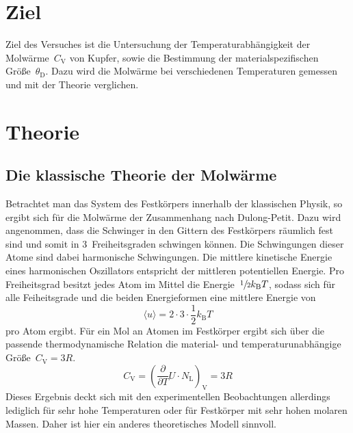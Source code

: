 \section{Ziel}
Ziel des Versuches ist die Untersuchung der Temperaturabhängigkeit der
Molwärme~$C_{\mathrm{V}}$ von Kupfer, sowie die Bestimmung der
materialspezifischen Größe~$\theta_{\mathrm{D}}$. Dazu wird die Molwärme bei
verschiedenen Temperaturen gemessen und mit der Theorie verglichen.

\section{Theorie}
\label{sec:theorie}

%
\subsection{Die klassische Theorie der Molwärme}
%
Betrachtet man das System des Festkörpers innerhalb der klassischen Physik, so
ergibt sich für die Molwärme der Zusammenhang nach Dulong-Petit. Dazu wird
angenommen, dass die Schwinger in den Gittern des Festkörpers räumlich fest sind
und somit in \num{3}~Freiheitsgraden schwingen können. Die Schwingungen dieser
Atome sind dabei harmonische Schwingungen. Die mittlere kinetische Energie eines
harmonischen Oszillators entspricht der mittleren potentiellen Energie. Pro
Freiheitsgrad besitzt jedes Atom im Mittel die
Energie~$\sfrac{1}{2}k_{\mathrm{B}}T$, sodass sich für alle Feiheitsgrade und
die beiden Energieformen eine mittlere Energie von
%
\begin{equation}
  \langle u\rangle=2\cdot 3\cdot\frac{1}{2}k_{\mathrm{B}}T
\end{equation}
%
pro Atom ergibt. Für ein Mol an Atomen im Festkörper ergibt sich über die
passende thermodynamische Relation die material- und temperaturunabhängige Größe~$C_{\mathrm{V}}=3R$.
%
\begin{equation}
  C_{\mathrm{V}}=\left(\frac{\partial}{\partial T}U\cdot N_{\mathrm{L}}\right)_{\mathrm{V}}=3R
  \label{eq:CV}
\end{equation}
%
Dieses Ergebnis deckt sich mit den experimentellen Beobachtungen allerdings
lediglich für sehr hohe Temperaturen oder für Festkörper mit sehr hohen molaren
Massen. Daher ist hier ein anderes theoretisches Modell sinnvoll.
%
